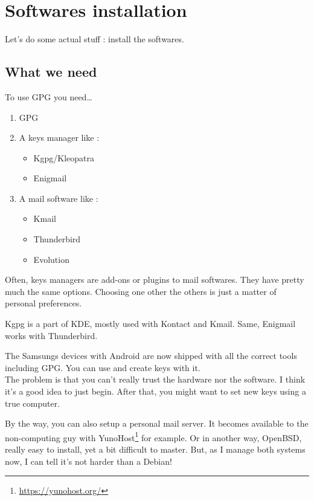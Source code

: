 \chapter{Softwares installation}

Let's do some actual stuff : install the softwares.

\section{What we need}\label{what-we-need}

To use GPG you need\ldots{}

\begin{enumerate}
\def\labelenumi{\arabic{enumi}.}
\item GPG
\item A keys manager like :

  \begin{itemize}
  \item Kgpg/Kleopatra
  \item Enigmail
  \end{itemize}
  
\item A mail software like :

  \begin{itemize}
  \item Kmail
  \item Thunderbird
  \item Evolution
  \end{itemize}
\end{enumerate}

Often, keys managers are add-ons or plugins to mail softwares. They have
pretty much the same options. Choosing one other the others is just a
matter of personal preferences.

Kgpg is a part of KDE, mostly used with Kontact and Kmail. Same,
Enigmail works with Thunderbird.

\begin{notice}
	The Samsungs devices with Android are now shipped with all the
	correct tools including GPG. You can use and create keys with it.\\The
	problem is that you can't really trust the hardware nor the software. I
	think it's a good idea to just begin. After that, you might want to set
	new keys using a true computer.
\end{notice}

By the way, you can also setup a personal mail server. It becomes
available to the non-computing guy with YunoHost\footnote{\url{https://yunohost.org/}} for example. Or in another way,
OpenBSD, really easy to install, yet a bit difficult to master. But, as I manage both systems now, I can tell it's not harder than a Debian!

